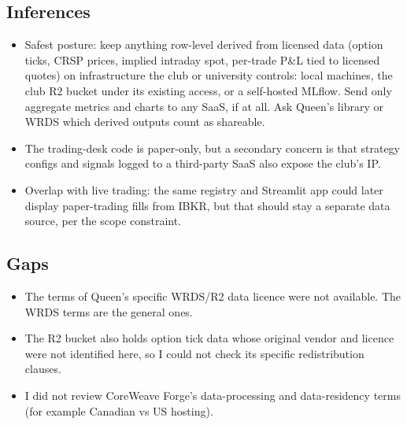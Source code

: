 \documentclass{article}
\begin{document}
\subsection{Inferences}

\begin{itemize}

\item Safest posture: keep anything row-level derived from licensed data (option ticks, CRSP prices, implied intraday spot, per-trade P\&L tied to licensed quotes) on infrastructure the club or university controls: local machines, the club R2 bucket under its existing access, or a self-hosted MLflow. Send only aggregate metrics and charts to any SaaS, if at all. Ask Queen's library or WRDS which derived outputs count as shareable.

\item The trading-desk code is paper-only, but a secondary concern is that strategy configs and signals logged to a third-party SaaS also expose the club's IP.

\item Overlap with live trading: the same registry and Streamlit app could later display paper-trading fills from IBKR, but that should stay a separate data source, per the scope constraint.

\end{itemize}

\subsection{Gaps}

\begin{itemize}

\item The terms of Queen's specific WRDS/\allowbreak{}R2 data licence were not available. The WRDS terms are the general ones.

\item The R2 bucket also holds option tick data whose original vendor and licence were not identified here, so I could not check its specific redistribution clauses.

\item I did not review CoreWeave Forge's data-processing and data-residency terms (for example Canadian vs US hosting).

\end{itemize}
\end{document}

